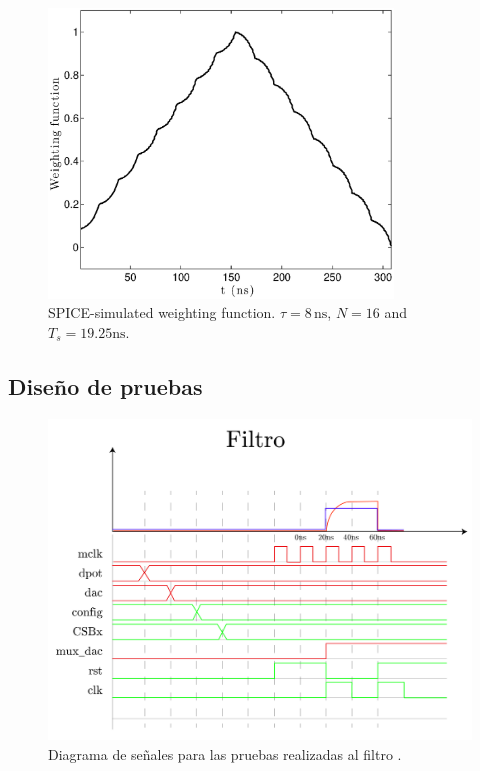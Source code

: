 \begin{figure}[!t]
	\centering
	\includegraphics[width=3.6in]{./figures/theorical/sim_wf}
	\caption{SPICE-simulated weighting function. $\tau=8\,\text{ns}$, $N=16$ and $T_s=19.25 \text{ns}$.}\label{fig:sim_wf}
\end{figure}

\subsection{Diseño de pruebas}

\begin{figure}[!t]
	\centering
	\includegraphics[width=1\textwidth]{./figures/theorical/tiempos_filtro.png}
	\caption{Diagrama de señales para las pruebas realizadas al filtro .}\label{fig:diagramafiltro}
\end{figure}

